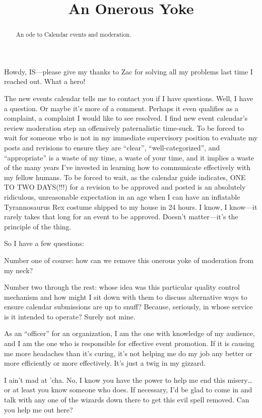 \documentclass[12pt, letterpaper, final]{article}
\title{An Onerous Yoke}
\author{}
\date{}
\begin{document}
\maketitle
\vspace{-0.5in}

\begin{abstract}
	\begin{center}
		An ode to Calendar events and moderation.
	\end{center}
\end{abstract}

Howdy, IS—please give my thanks to Zac for solving all my problems last time I reached out.
What a hero!

The new events calendar tells me to contact you if I have questions.
Well, I have a question.
Or maybe it's more of a comment.
Perhaps it even qualifies as a complaint, a complaint I would like to see resolved.
I find new event calendar's review moderation step an offensively paternalistic time-suck.
To be forced to wait for someone who is not in my immediate supervisory position to evaluate my posts and revisions to ensure they are “clear”, “well-categorized”, and “appropriate” is a waste of my time, a waste of your time, and it implies a waste of the many years I've invested in learning how to communicate effectively with my fellow humans.
To be forced to wait, as the calendar guide indicates, {\large ONE TO TWO DAYS(!!!)} for a revision to be approved and posted is an absolutely ridiculous, unreasonable expectation in an age when I can have an inflatable Tyrannosaurus Rex costume shipped to my house in 24 hours.
I know, I know—it rarely takes that long for an event to be approved.
Doesn't matter—it's the principle of the thing.

So I have a few questions:

Number one of course: how can we remove this {\Huge onerous yoke} of moderation from my neck?

Number two through the rest: whose idea was this particular quality control mechanism and how might I sit down with them to discuss alternative ways to ensure calendar submissions are up to snuff?
Because, seriously, in whose service is it intended to operate? Surely not mine.

As an “officer” for an organization, I am the one with knowledge of my audience, and I am the one who is responsible for effective event promotion.
If it is causing me more headaches than it's curing, it's not helping me do my job any better or more efficiently or more effectively.
It's just a twig in my gizzard.

I ain't mad at 'cha.
No, I know you have the power to help me end this misery\ldots or at least you know someone who does.
If necessary, I'd be glad to come in and talk with any one of the wizards down there to get this evil spell removed.
Can you help me out here?
\end{document}
